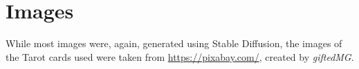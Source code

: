 \section{Images}
While most images were, again, generated using Stable Diffusion,
	the images of the Tarot cards used were taken from \url{https://pixabay.com/}, created by \emph{giftedMG}.
